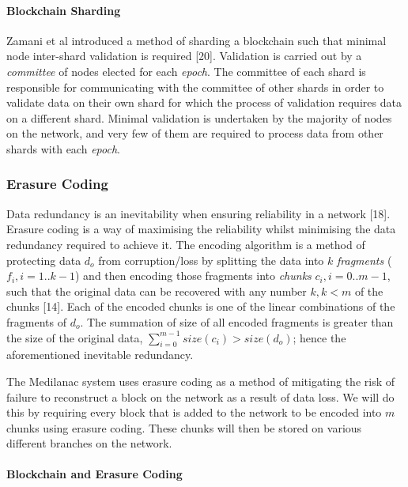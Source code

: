 \documentclass[]{article}
\let\oldparagraph\paragraph
\renewcommand{\paragraph}[1]{\oldparagraph{#1}\mbox{}}
\begin{document}
\hypertarget{header-n18}{%
\paragraph{Blockchain Sharding}\label{header-n18}}

Zamani et al introduced a method of sharding a blockchain such that
minimal node inter-shard validation is required {[}20{]}. Validation is
carried out by a \emph{committee} of nodes elected for each
\emph{epoch}. The committee of each shard is responsible for
communicating with the committee of other shards in order to validate
data on their own shard for which the process of validation requires
data on a different shard. Minimal validation is undertaken by the
majority of nodes on the network, and very few of them are required to
process data from other shards with each \emph{epoch}.

\hypertarget{header-n20}{%
\subsubsection{Erasure Coding}\label{header-n20}}

Data redundancy is an inevitability when ensuring reliability in a
network {[}18{]}. Erasure coding is a way of maximising the reliability
whilst minimising the data redundancy required to achieve it. The
encoding algorithm is a method of protecting data \(d_{o}\) from
corruption/loss by splitting the data into \(k\) \emph{fragments}
(\( f_{i}, i = 1..k-1\)) and then encoding those fragments into
\emph{chunks} \(c_{i}, i = 0..m-1\), such that the original data can be
recovered with any number \(k, k<m\) of the chunks {[}14{]}. Each of the
encoded chunks is one of the linear combinations of the fragments of
\(d_{o}\). The summation of size of all encoded fragments is greater
than the size of the original data,
\( \sum_{i=0}^{m-1}size(c_{i}) > size(d_{o})\); hence the aforementioned
inevitable redundancy.

The Medilanac system uses erasure coding as a method of mitigating the
risk of failure to reconstruct a block on the network as a result of
data loss. We will do this by requiring every block that is added to the
network to be encoded into \(m\) chunks using erasure coding. These
chunks will then be stored on various different branches on the network.

\hypertarget{header-n23}{%
\paragraph{Blockchain and Erasure Coding}\label{header-n23}}
\end{document}

